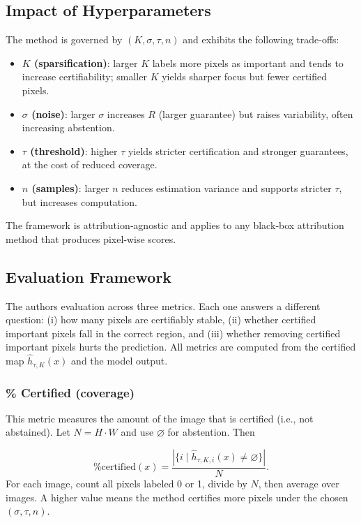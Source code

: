 \documentclass[11pt]{article}
\begin{document}
\subsection{Impact of Hyperparameters}
The method is governed by $(K,\sigma,\tau,n)$ and exhibits the following trade‑offs:
\begin{itemize}
\item \textbf{$K$ (sparsification)}: larger $K$ labels more pixels as important and tends to increase certifiability; smaller $K$ yields sharper focus but fewer certified pixels.
\item \textbf{$\sigma$ (noise)}: larger $\sigma$ increases $R$ (larger guarantee) but raises variability, often increasing abstention.
\item \textbf{$\tau$ (threshold)}: higher $\tau$ yields stricter certification and stronger guarantees, at the cost of reduced coverage.
\item \textbf{$n$ (samples)}: larger $n$ reduces estimation variance and supports stricter $\tau$, but increases computation.
\end{itemize}
The framework is attribution‑agnostic and applies to any black‑box attribution method that produces pixel‑wise scores.



\subsection{Evaluation Framework}
The authors evaluation across three metrics. Each one answers a different question: (i) how many pixels are certifiably stable, (ii) whether certified important pixels fall in the correct region, and (iii) whether removing certified important pixels hurts the prediction. All metrics are computed from the certified map $\hat{h}_{\tau,K}(x)$ and the model output.

\subsubsection{\% Certified (coverage)}
This metric measures the amount of the image that is certified (i.e., not abstained). 
Let $N=H\cdot W$ and use $\varnothing$ for abstention. Then

$$
\%\mathrm{certified}(x) = \frac{|\{i \mid \hat{h}_{\tau,K,i}(x) \neq \varnothing\}|}{N}.
$$
For each image, count all pixels labeled 0 or 1, divide by $N$, then average over images. A higher value means the method certifies more pixels under the chosen $(\sigma,\tau,n)$.
\end{document}
